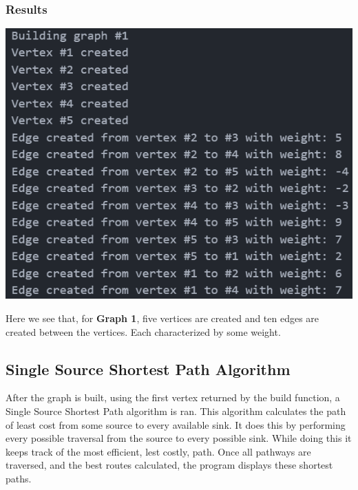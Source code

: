 \documentclass[12pt, letterpaper]{article}
\begin{document}
\subsubsection{Results}
\begin{center}
   \includegraphics{images/Graph1_ParseBuild.png}
\end{center}
Here we see that, for \textbf{Graph 1}, five vertices are created and ten edges are created between the vertices.
Each characterized by some weight.

\subsection{Single Source Shortest Path Algorithm} \label{Graph_SSSP}
After the graph is built, using the first vertex returned by the build function, a Single Source Shortest Path algorithm is ran.
This algorithm calculates the path of least cost from some source to every available sink.
It does this by performing every possible traversal from the source to every possible sink.
While doing this it keeps track of the most efficient, lest costly, path.
Once all pathways are traversed, and the best routes calculated, the program displays these shortest paths.
\end{document}
